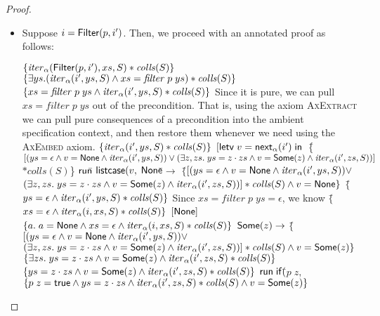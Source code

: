 \begin{proof}
\begin{itemize}
\item Suppose $i = \mathsf{Filter}(p, i')$. Then, we proceed with an annotated proof as 
follows: 
\begin{specification}
\nextline $\{{\mathit{iter}_\alpha(\mathsf{Filter}(p, i'), xs, S) * \mathit{colls}(S)}\}$ 
\nextline $\{{\exists ys. (\mathit{iter}_\alpha(i', ys, S) \land 
                              xs = \mathit{filter}\;p\;ys) * 
                              \mathit{colls}(S)}\}$   
\nextline $\{{xs = \mathit{filter}\;p\;ys \land
                  \mathit{iter}_\alpha(i', ys, S) *
                  \mathit{colls}(S)}\}$
\nextline Since it is pure, we can pull $xs = \mathit{filter}\;p\;ys$ out of the precondition. 
\nextline That is, using the axiom \textsc{AxExtract} we can pull pure consequences 
\nextline of a precondition into the ambient specification context, and then 
\nextline restore them whenever we need using the \textsc{AxEmbed} axiom. 
\nextline $\{{\mathit{iter}_\alpha(i', ys, S) * \mathit{colls}(S)}\}$
\nextline $[\mathsf{letv}\;v = \mathsf{next}_\alpha(i')\;\mathsf{in}\;$ 
\nextline \{\=$[(ys = \epsilon \land v = \mathsf{None} \land \mathit{iter}_\alpha(i', ys, S)) \vee 
                (\exists z, zs.\; ys = z\cdot zs \land v = \mathsf{Some}(z) \land \mathit{iter}_\alpha(i', zs, S))]$
\nextline \> $ * \mathit{colls}(S)$\}
\nextline \;$\mathsf{run}$\=$\;\mathsf{listcase}(v,$ 
\nextline \> $\mathsf{None}$\=$ \to $ 
\nextline \> \> $\{$\=$[(ys = \epsilon \land v = \mathsf{None} \land \mathit{iter}_\alpha(i', ys, S)) \vee $
\nextline \> \>     \>$(\exists z, zs.\; ys = z\cdot zs \land v = \mathsf{Some}(z) \land \mathit{iter}_\alpha(i', zs, S))] * \mathit{colls}(S) \land v = \mathsf{None}\}$
\nextline \> \> $\{$\=$ys = \epsilon \land \mathit{iter}_\alpha(i', ys, S) * \mathit{colls}(S)\}$
\nextline \> \> Since $xs = \mathit{filter}\;p\;ys = \epsilon$, we know
\nextline \> \> $\{$\=$xs = \epsilon \land \mathit{iter}_\alpha(i, xs, S) * \mathit{colls}(S)\}$
\nextline \> \> $[\mathsf{None}]$ 
\nextline \> \> $\{a.\; a = \mathsf{None} \land xs = \epsilon \land \mathit{iter}_\alpha(i, xs, S) * \mathit{colls}(S)\}$
\nextline \> $\mathsf{Some}(z)\to$
\nextline \> \> $\{$\=$[(ys = \epsilon \land v = \mathsf{None} \land \mathit{iter}_\alpha(i', ys, S)) \vee $
\nextline \> \> \> $(\exists z, zs.\; ys = z\cdot zs \land v = \mathsf{Some}(z) \land \mathit{iter}_\alpha(i', zs, S))] * \mathit{colls}(S) \land v = \mathsf{Some}(z)\}$
\nextline \> \> $\{\exists zs.\; ys = z\cdot zs \land v = \mathsf{Some}(z) \land \mathit{iter}_\alpha(i', zs, S) * \mathit{colls}(S)\}$
\nextline \> \> $\{ys = z\cdot zs \land v = \mathsf{Some}(z) \land \mathit{iter}_\alpha(i', zs, S) * \mathit{colls}(S)\}$
\nextline \> \> $\mathsf{run}\;\mathsf{if}($\=$p\;z,$ 
\nextline \> \> \> $\{p\;z = \mathsf{true} \land ys = z\cdot zs \land \mathit{iter}_\alpha(i', zs, S) * \mathit{colls}(S) \land v = \mathsf{Some}(z)\}$

\end{specification}
\end{itemize}
\end{proof}

